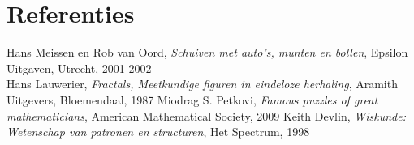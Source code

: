 \section{Referenties}

\begin{thebibliography}{1}
\label{1} Hans Meissen en Rob van Oord, \textit{Schuiven met auto's, munten en bollen}, Epsilon Uitgaven, Utrecht, 2001-2002\\
\label{2} Hans Lauwerier, \textit{Fractals, Meetkundige figuren in eindeloze herhaling}, Aramith Uitgevers, Bloemendaal, 1987
\label{3} Miodrag S. Petkovi, \textit{Famous puzzles of great mathematicians}, American Mathematical Society, 2009
\label{4} Keith Devlin, \textit{Wiskunde: Wetenschap van patronen en structuren}, Het Spectrum, 1998
\end{thebibliography}
